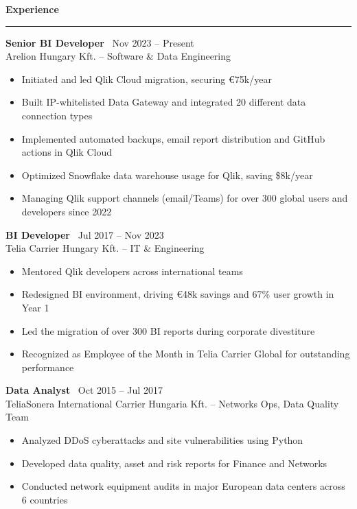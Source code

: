 \documentclass[a4paper,11pt]{article}
\renewcommand{\scriptsize}{\fontsize{9}{10}\selectfont}
\newcommand{\heading}[1]{\vspace{6pt}\textbf{\large #1}\vspace{2pt}\hrule\vspace{2pt}}
\newcommand{\subheading}[1]{\vspace{4pt} \textbf{#1}\vspace{2pt}}
\begin{document}
\vspace{-10pt}
\heading{Experience}
\subheading{Senior BI Developer} {\scriptsize \textbar\ Nov 2023 -- Present \vspace{-2pt}\\
{Arelion Hungary Kft. -- Software \& Data Engineering}}
\vspace{1pt}
\begin{itemize}[noitemsep, topsep=0pt]
    \item Initiated and led Qlik Cloud migration, securing €75k/year
    \item Built IP-whitelisted Data Gateway and integrated 20 different data connection types
    \item Implemented automated backups, email report distribution and GitHub actions in Qlik Cloud
    \item Optimized Snowflake data warehouse usage for Qlik, saving \$8k/year
    \item Managing Qlik support channels (email/Teams) for over 300 global users and developers since 2022
\end{itemize}

\subheading{BI Developer} {\scriptsize \textbar\ Jul 2017 -- Nov 2023 \vspace{-2pt}\\
{Telia Carrier Hungary Kft. -- IT \& Engineering}}
\vspace{1pt}
\begin{itemize}[noitemsep, topsep=0pt]
    \item Mentored Qlik developers across international teams
    \item Redesigned BI environment, driving €48k savings and 67\% user growth in Year 1
    \item Led the migration of over 300 BI reports during corporate divestiture
    \item Recognized as Employee of the Month in Telia Carrier Global for outstanding performance
\end{itemize}

\subheading{Data Analyst} {\scriptsize \textbar\ Oct 2015 -- Jul 2017 \vspace{-2pt}\\
{TeliaSonera International Carrier Hungaria Kft. -- Networks Ops, Data Quality Team}}
\vspace{1pt}
\begin{itemize}[noitemsep, topsep=0pt]
    \item Analyzed DDoS cyberattacks and site vulnerabilities using Python
    \item Developed data quality, asset and risk reports for Finance and Networks
    \item Conducted network equipment audits in major European data centers across 6 countries
\end{itemize}
\end{document}
